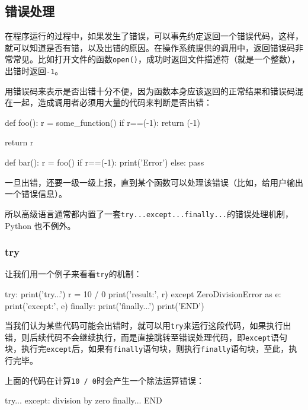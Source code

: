 \hypertarget{ux9519ux8befux5904ux7406}{%
\subsection{错误处理}\label{ux9519ux8befux5904ux7406}}

在程序运行的过程中，如果发生了错误，可以事先约定返回一个错误代码，这样，就可以知道是否有错，以及出错的原因。在操作系统提供的调用中，返回错误码非常常见。比如打开文件的函数\texttt{open()}，成功时返回文件描述符（就是一个整数），出错时返回\texttt{-1}。

用错误码来表示是否出错十分不便，因为函数本身应该返回的正常结果和错误码混在一起，造成调用者必须用大量的代码来判断是否出错：

\begin{pythoncode}
def foo():
    r = some_function()
    if r==(-1):
        return (-1)
    
    return r

def bar():
    r = foo()
    if r==(-1):
        print('Error')
    else:
        pass
\end{pythoncode}

一旦出错，还要一级一级上报，直到某个函数可以处理该错误（比如，给用户输出一个错误信息）。

所以高级语言通常都内置了一套\texttt{try...except...finally...}的错误处理机制，Python
也不例外。

\hypertarget{try}{%
\subsubsection{try}\label{try}}

让我们用一个例子来看看\texttt{try}的机制：

\begin{pythoncode}
try:
    print('try...')
    r = 10 / 0
    print('result:', r)
except ZeroDivisionError as e:
    print('except:', e)
finally:
    print('finally...')
print('END')
\end{pythoncode}

当我们认为某些代码可能会出错时，就可以用\texttt{try}来运行这段代码，如果执行出错，则后续代码不会继续执行，而是直接跳转至错误处理代码，即\texttt{except}语句块，执行完\texttt{except}后，如果有\texttt{finally}语句块，则执行\texttt{finally}语句块，至此，执行完毕。

上面的代码在计算\texttt{10\ /\ 0}时会产生一个除法运算错误：

\begin{pythoncode}
try...
except: division by zero
finally...
END
\end{pythoncode}

